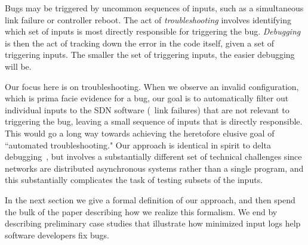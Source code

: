 Bugs may be triggered by uncommon sequences of inputs, such as a simultaneous link failure or controller reboot.
The act of {\em troubleshooting} involves identifying which set of inputs is most directly responsible for triggering the bug.
{\em Debugging} is then the act of tracking down the error in the code itself, given a
set of triggering inputs.
The smaller the set of triggering inputs, the easier debugging will be.

Our focus here is on troubleshooting. When we observe an invalid
configuration,
which is prima facie evidence for a bug, our goal is
to automatically filter out individual inputs to the SDN software (\eg~link failures)
that are not relevant to triggering the bug, leaving a small sequence of inputs
that is directly responsible.
This would go a long way towards achieving the heretofore elusive goal of ``automated troubleshooting."
Our approach is identical in spirit to delta debugging~\cite{Zeller:1999:YMP:318773.318946},
but involves a substantially different set of technical challenges since networks are
distributed asynchronous systems rather than a single program, and this
substantially complicates the task of testing subsets of the inputs.

In the next section we give a formal definition of our approach, and then spend
the bulk of the paper describing how we realize this formalism.
We end by describing preliminary case studies that illustrate how minimized
input logs help software developers fix bugs.
